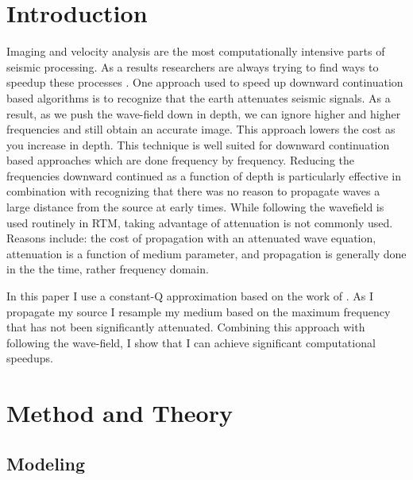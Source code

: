 \documentclass{paris17}
\begin{document}
\section{Introduction}

Imaging and velocity analysis are the most computationally intensive parts of seismic processing. As a results researchers are always trying to find ways to speedup these processes \cite[]{bednar,Stork}.  One approach used to speed up downward continuation based algorithms is to recognize that the earth attenuates seismic signals.  As a result, as we push the wave-field down in depth, we can ignore higher and higher frequencies and still obtain an accurate image\cite[]{Clapp.sep.111.bob3}.  This approach lowers the cost as you increase in depth. This technique is well suited for downward continuation based approaches which are done frequency by frequency.  Reducing the frequencies downward continued as a function of depth  is particularly effective in combination with recognizing that there was no reason to propagate waves a large distance from the source at early times.  While following the wavefield is used routinely in RTM,  taking advantage of attenuation is not commonly used.  Reasons include: the cost of propagation with an attenuated wave equation, attenuation is a function of medium parameter, and propagation is generally done in the the time, rather frequency domain.

In this paper I use a constant-Q approximation based on the work of \cite[]{zhu}.  As I propagate my source I resample my medium based on the maximum frequency that has not been significantly attenuated. Combining this approach with following the wave-field, I show that I can achieve significant computational speedups.

\section{Method and Theory}

\subsection{Modeling}
\end{document}
